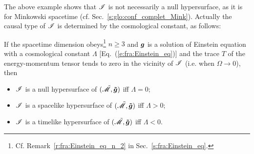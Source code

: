 The above example shows that $\mathscr{I}$ is not necessarily a null hypersurface,
as it is for Minkowski spacetime (cf. Sec.~\ref{s:glo:conf_complet_Mink}).
Actually the causal type of $\mathscr{I}$ is determined by the cosmological
constant, as follows:
\begin{prop}
If the spacetime dimension obeys\footnote{Cf. Remark~\ref{r:fra:Einstein_eq_n_2} in
Sec.~\ref{s:fra:Einstein_eq}.}
$n\geq 3$ and $\bm{g}$ is a solution of Einstein equation with
a cosmological constant $\Lambda$ [Eq.~(\ref{e:fra:Einstein_eq})]
and the trace $T$ of the energy-momentum tensor tends to zero in the
vicinity of $\mathscr{I}$ (i.e. when $\Omega\rightarrow 0$), then
\begin{itemize}
\item $\mathscr{I}$ is a null hypersurface of $(\tilde{\mathscr{M}},\bm{\tilde{g}})$ iff $\Lambda=0$;
\item $\mathscr{I}$ is a spacelike hypersurface of $(\tilde{\mathscr{M}},\bm{\tilde{g}})$ iff $\Lambda>0$;
\item $\mathscr{I}$ is a timelike hypersurface of $(\tilde{\mathscr{M}},\bm{\tilde{g}})$ iff $\Lambda<0$.
\end{itemize}
\end{prop}
